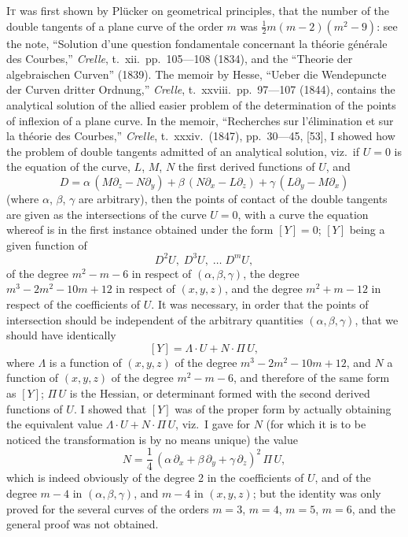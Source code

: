 \documentclass[11pt,a4paper]{book}
\begin{document}
\textsc{It} was first shown by Pl\"{u}cker on geometrical principles, that the number of the double tangents of a plane curve of the order $m$ was $\frac{1}{2}m(m-2)(m^2-9)$: see the note, ``Solution d'une question fondamentale concernant la th\'{e}orie g\'{e}n\'{e}rale des Courbes,'' \textit{Crelle}, t.~xii.\ pp.~105---108 (1834), and the ``Theorie der algebraischen Curven'' (1839). The memoir by Hesse, ``Ueber die Wendepuncte der Curven dritter Ordnung,'' \textit{Crelle}, t.~xxviii.\ pp.~97---107 (1844), contains the analytical solution of the allied easier problem of the determination of the points of inflexion of a plane curve. In the memoir, ``Recherches sur l'\'{e}limination et sur la th\'{e}orie des Courbes,'' \textit{Crelle}, t.~xxxiv.\ (1847), pp.~30---45, [53], I showed how the problem of double tangents admitted of an analytical solution, viz.\ if $U=0$ is the equation of the curve, $L$, $M$, $N$ the first derived functions of $U$, and
\[
D = \alpha\,(M\partial_z - N\partial_y) + \beta\,(N\partial_x - L\partial_z) + \gamma\,(L\partial_y - M\partial_x)
\]
(where $\alpha$, $\beta$, $\gamma$ are arbitrary), then the points of contact of the double tangents are given as the intersections of the curve $U=0$, with a curve the equation whereof is in the first instance obtained under the form $[Y]=0$; $[Y]$ being a given function of
\[
D^2 U,\; D^3 U,\; \ldots\; D^m U,
\]
of the degree $m^2-m-6$ in respect of $(\alpha, \beta, \gamma)$, the degree $m^3-2m^2-10m+12$ in respect of $(x, y, z)$, and the degree $m^2+m-12$ in respect of the coefficients of $U$. It was necessary, in order that the points of intersection should be independent of the arbitrary quantities $(\alpha, \beta, \gamma)$, that we should have identically
\[
[Y] = \Lambda \cdot U + N \cdot \Pi\, U,
\]
where $\Lambda$ is a function of $(x, y, z)$ of the degree $m^3-2m^2-10m+12$, and $N$ a function of $(x, y, z)$ of the degree $m^2-m-6$, and therefore of the same form as $[Y]$; $\Pi\,U$ is the Hessian, or determinant formed with the second derived functions of $U$. I showed that $[Y]$ was of the proper form by actually obtaining the equivalent value $\Lambda \cdot U + N \cdot \Pi\,U$, viz.\ I gave for $N$ (for which it is to be noticed the transformation is by no means unique) the value
\[
N = \frac{1}{4}\,(\alpha\,\partial_x + \beta\,\partial_y + \gamma\,\partial_z)^2\, \Pi\,U,
\]
which is indeed obviously of the degree 2 in the coefficients of $U$, and of the degree $m-4$ in $(\alpha, \beta, \gamma)$, and $m-4$ in $(x, y, z)$; but the identity was only proved for the several curves of the orders $m=3$, $m=4$, $m=5$, $m=6$, and the general proof was not obtained.
\end{document}
